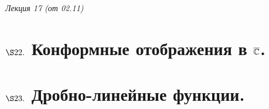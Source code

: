 \begin{flushright}
    \textit{Лекция 17 (от 02.11)}
\end{flushright}
\section{$\S 22.$ Конформные отображения в $\overline{\mathbb{C}}$.}
\section{$\S 23.$ Дробно-линейные функции.}
